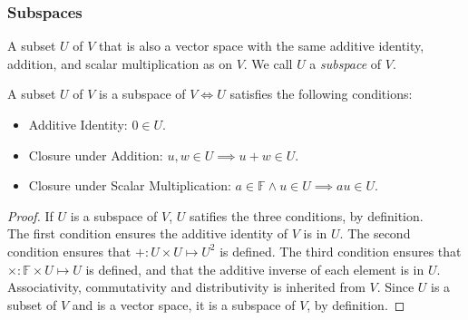 \subsubsection{Subspaces}
\begin{definition}[Subspace]
  A subset $U$ of $V$ that is also a vector space with the same additive identity, addition,
  and scalar multiplication as on $V$. We call $U$ a \emph{subspace} of $V$.
\end{definition}
\begin{prop}
  A subset $U$ of $V$ is a subspace of $V \iff U$ satisfies the following conditions:
  \begin{itemize}
    \item Additive Identity: $0\in U$.
    \item Closure under Addition: $u,w\in U \implies u+w\in U$.
    \item Closure under Scalar Multiplication: $a\in \mathbb{F}\wedge u\in U \implies au\in U$.
  \end{itemize}
\end{prop}
\begin{proof}
  If $U$ is a subspace of $V$, $U$ satifies the three conditions, by definition.\\
  The first condition ensures the additive identity of $V$ is in $U$. The
  second condition ensures that $+:U\times U \mapsto U^{2}$ is defined. The
  third condition ensures that $\times: \mathbb{F}\times U \mapsto U$ is
  defined, and that the additive inverse of each element is in $U$.
  Associativity, commutativity and distributivity is inherited from $V$.
  Since $U$ is a subset of $V$ and is a vector space, it is a subspace of $V$,
  by definition.
\end{proof}

